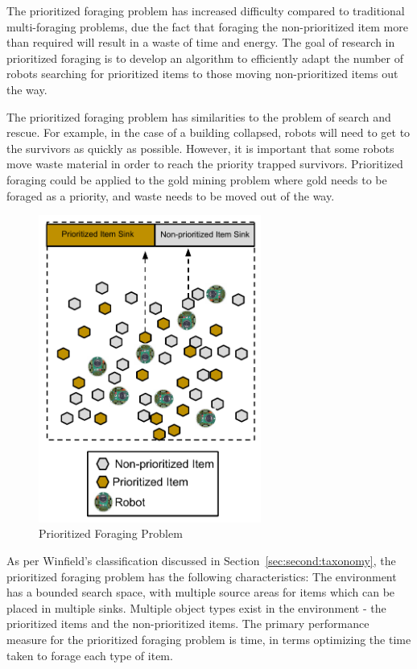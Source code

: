 The prioritized foraging problem has increased difficulty compared to traditional multi-foraging problems, due the fact that foraging the non-prioritized item more than required will result in a waste of time and energy. The goal of research in prioritized foraging is to develop an algorithm to efficiently adapt the number of robots searching for prioritized items to those moving non-prioritized items out the way. 

The prioritized foraging problem has similarities to the problem of search and rescue. For example, in the case of a building collapsed, robots will need to get to the survivors as quickly as possible. However, it is important that some robots move waste material in order to reach the priority trapped survivors. Prioritized foraging could be applied to the gold mining problem where gold needs to be foraged as a priority, and waste needs to be moved out of the way.


\begin{figure} [h]
	\centering
	\includegraphics[width=0.65\textwidth]{chapters/chapter2/figures/EpuckGoldMining.pdf}
	\caption{Prioritized Foraging Problem }
	\label{prioritizedforaging}
\end{figure}

As per Winfield's classification discussed in Section~\ref{sec:second:taxonomy}, the prioritized foraging problem has the following characteristics: The environment has a bounded search space, with multiple source areas for items which can be placed in multiple sinks. Multiple object types exist in the environment - the prioritized items and the non-prioritized items. The primary  performance measure for the prioritized foraging problem is time, in terms optimizing the time taken to forage each type of item. 



